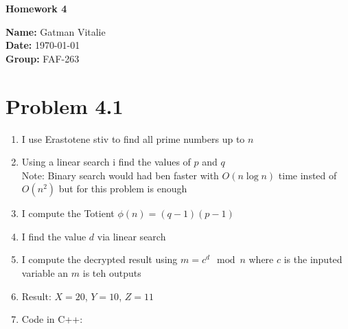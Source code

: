\documentclass[12pt]{article}
\begin{document}
\begin{titlepage}
    \thispagestyle{fancy} %
    \centering
    
    \vspace*{4cm}

    {\Huge \bfseries Homework 4}

    \vspace{4cm}

    {\Large \textbf{Name:} Gatman Vitalie} \\[0.5em]
    {\Large \textbf{Date:} \today} \\[0.5em]
    {\Large \textbf{Group:} FAF-263}

    \vfill
\end{titlepage}

\newpage

\section*{Problem 4.1}

\begin{enumerate}
    \item I use Erastotene stiv to find all prime numbers up to $n$
    \item Using a linear search i find the values of $p$ and $q$\\
    \small{Note: Binary search would had ben faster with $O(n\log{n})$ time insted of $O(n^2)$ but for this problem is enough}
    \item I compute the Totient $\phi(n)=(q-1)(p-1)$
    \item I find the value $d$ via linear search
    \item I compute the decrypted result using $m=c^d \mod n$ where $c$ is the inputed variable an $m$ is teh outputs
    \item Result: $X = 20$, $Y=10$, $Z=11$
    \item Code in C++:
\end{enumerate}
\end{document}
